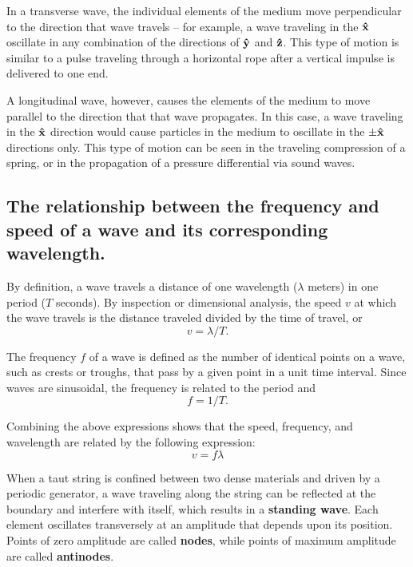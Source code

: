 \documentclass[twocolumn,english]{IEEEtran}
\theoremstyle{plain}
\theoremstyle{plain}
\begin{document}
In a transverse wave, the individual elements of the medium move perpendicular to the direction that wave travels -- for example, a wave traveling in the $\bf{\hat x}$ oscillate in any combination of the directions of $\bf{\hat y}$ and $\bf{\hat z}$. This type of motion is similar to a pulse traveling through a horizontal rope after a vertical impulse is delivered to one end.

A longitudinal wave, however, causes the elements of the medium to move parallel to the direction that that wave propagates. In this case, a wave traveling in the $\bf{\hat x}$ direction would cause particles in the medium to oscillate in the $\pm\bf{\hat x}$ directions only. This type of motion can be seen in the traveling compression of a spring, or in the propagation of a pressure differential via sound waves.

\subsection*{The relationship between the frequency and speed of a wave and its corresponding wavelength.}

By definition, a wave travels a distance of one wavelength ($\lambda$ meters) in one period ($T$ seconds). By inspection or dimensional analysis, the speed $v$ at which the wave travels is the distance traveled divided by the time of travel, or
\begin{equation*}
 v=\lambda / T.
\end{equation*}

The frequency $f$ of a wave is defined as the number of identical points on a wave, such as crests or troughs, that pass by a given point in a unit time interval. Since waves are sinusoidal, the frequency is related to the period and
\begin{equation*}
f=1/T.
\end{equation*}

Combining the above expressions shows that the speed, frequency, and wavelength are related by the following expression:
\begin{equation}\label{eq:v.f.lambda}
 v=f\lambda
\end{equation}

When a taut string is confined between two dense materials and driven by a periodic generator, a wave traveling along the string can be reflected at the boundary and interfere with itself, which results in a \textbf{standing wave}. Each element oscillates transversely at an amplitude that depends upon its position. Points of zero amplitude are called \textbf{nodes}, while points of maximum amplitude are called \textbf{antinodes}.
\end{document}
